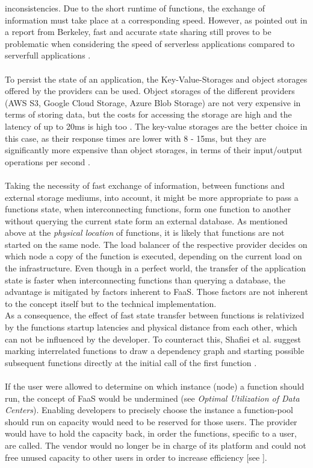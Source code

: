 \documentclass[a4paper,twoside,11pt, pagesize]{scrartcl}
\begin{document}
\begin{spacing}{1.2}
inconsistencies. Due to the short runtime of functions, the exchange of information must take place at a corresponding speed. However, as pointed out in a report from Berkeley, fast and accurate state sharing still proves to be problematic when considering the speed of serverless applications compared to serverfull applications \cite{jonas2019cloud}.\\\\ To persist the state of an application, the Key-Value-Storages and object storages offered by the providers can be used. Object storages of the different providers (AWS S3, Google Cloud Storage, Azure Blob Storage) are not very expensive in terms of storing data, but the costs for accessing the storage are high and the latency of up to 20ms is high too \cite{jonas2019cloud}. The key-value storages are the better choice in this case, as their response times are lower with 8 - 15ms, but they are significantly more expensive than object storages, in terms of their input/output operations per second \cite{jonas2019cloud}.\\\\ Taking the necessity of fast exchange of information, between functions and external storage mediums, into account, it might be more appropriate to pass a functions state, when interconnecting functions, form one function to another without querying the current state form an external database. As mentioned above at the \textit{physical location} of functions, it is likely that functions are not started on the same node. The load balancer of the respective provider decides on which node a copy of the function is executed, depending on the current load on the infrastructure. Even though in a perfect world, the transfer of the application state is faster when interconnecting functions than querying a database, the advantage is mitigated by factors inherent to FaaS. Those factors are not inherent to the concept itself but to the technical implementation.\\ As a consequence, the effect of fast state transfer between functions is relativized by the functions startup latencies and physical distance from each other, which can not be influenced by the developer. To counteract this, Shaﬁei et al. suggest marking interrelated functions to draw a dependency graph and starting possible subsequent functions directly at the initial call of the first function \cite{shafiei2020serverless}.\\\\ If the user were allowed to determine on which instance (node) a function should run, the concept of FaaS would be undermined (see \textit{Optimal Utilization of Data Centers}). Enabling developers to precisely choose the instance a function-pool should run on capacity would need to be reserved for those users. The provider would have to hold the capacity back, in order the functions, specific to a user, are called. The vendor would no longer be in charge of its platform and could not free unused capacity to other users in order to increase efficiency [see \cite{fowler2018serverless}]. 

\end{spacing}
\end{document}
